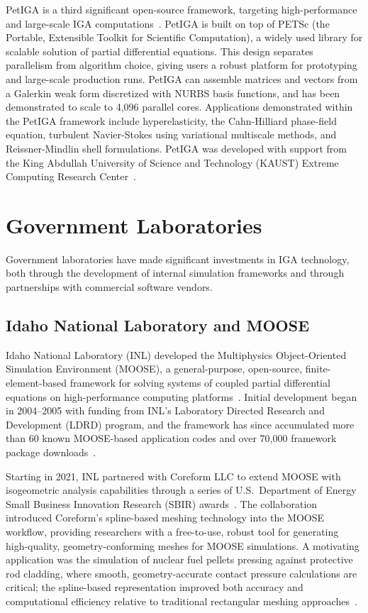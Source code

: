 \documentclass[12pt,report,justified]{SANDreport}
\begin{document}
PetIGA is a third significant open-source framework, targeting high-performance and large-scale IGA computations~\cite{Dalcin2016PetIGA}.  PetIGA is built on top of PETSc (the Portable, Extensible Toolkit for Scientific Computation), a widely used library for scalable solution of partial differential equations.  This design separates parallelism from algorithm choice, giving users a robust platform for prototyping and large-scale production runs.  PetIGA can assemble matrices and vectors from a Galerkin weak form discretized with NURBS basis functions, and has been demonstrated to scale to 4,096 parallel cores.  Applications demonstrated within the PetIGA framework include hyperelasticity, the Cahn-Hilliard phase-field equation, turbulent Navier-Stokes using variational multiscale methods, and Reissner-Mindlin shell formulations.  PetIGA was developed with support from the King Abdullah University of Science and Technology (KAUST) Extreme Computing Research Center~\cite{Dalcin2016PetIGA}.

\section{Government Laboratories}

Government laboratories have made significant investments in IGA technology, both through the development of internal simulation frameworks and through partnerships with commercial software vendors.

\subsection{Idaho National Laboratory and MOOSE}
\label{sec:moose}

Idaho National Laboratory (INL) developed the Multiphysics Object-Oriented Simulation Environment (MOOSE), a general-purpose, open-source, finite-element-based framework for solving systems of coupled partial differential equations on high-performance computing platforms~\cite{Martineau2021MOOSE}.  Initial development began in 2004--2005 with funding from INL's Laboratory Directed Research and Development (LDRD) program, and the framework has since accumulated more than 60 known MOOSE-based application codes and over 70,000 framework package downloads~\cite{Martineau2021MOOSE}.

Starting in 2021, INL partnered with Coreform LLC to extend MOOSE with isogeometric analysis capabilities through a series of U.S.\ Department of Energy Small Business Innovation Research (SBIR) awards~\cite{INLCoreformMOOSE2021}.  The collaboration introduced Coreform's spline-based meshing technology into the MOOSE workflow, providing researchers with a free-to-use, robust tool for generating high-quality, geometry-conforming meshes for MOOSE simulations.  A motivating application was the simulation of nuclear fuel pellets pressing against protective rod cladding, where smooth, geometry-accurate contact pressure calculations are critical; the spline-based representation improved both accuracy and computational efficiency relative to traditional rectangular meshing approaches~\cite{INLCoreformMOOSE2021}.
\end{document}
